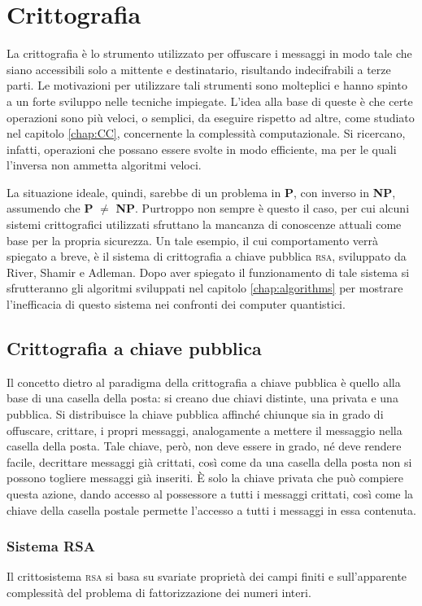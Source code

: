 \chapter{Crittografia}\label{app:Crypto}
La crittografia è lo strumento utilizzato per offuscare i messaggi in modo tale che siano accessibili solo a mittente e destinatario, risultando indecifrabili a terze parti.
Le motivazioni per utilizzare tali strumenti sono molteplici e hanno spinto a un forte sviluppo nelle tecniche impiegate.
L'idea alla base di queste è che certe operazioni sono più veloci, o semplici, da eseguire rispetto ad altre, come studiato nel capitolo \ref{chap:CC}, concernente la complessità computazionale.
Si ricercano, infatti, operazioni che possano essere svolte in modo efficiente, ma per le quali l'inversa non ammetta algoritmi veloci.

La situazione ideale, quindi, sarebbe di un problema in \textbf{P}, con inverso in \textbf{NP}, assumendo che \textbf{P} $\neq$ \textbf{NP}.
Purtroppo non sempre è questo il caso, per cui alcuni sistemi crittografici utilizzati sfruttano la mancanza di conoscenze attuali come base per la propria sicurezza.
Un tale esempio, il cui comportamento verrà spiegato a breve, è il sistema di crittografia a chiave pubblica \textsc{rsa}, sviluppato da River, Shamir e Adleman.
Dopo aver spiegato il funzionamento di tale sistema si sfrutteranno gli algoritmi sviluppati nel capitolo \ref{chap:algorithms} per mostrare l'inefficacia di questo sistema nei confronti dei computer quantistici.

\section{Crittografia a chiave pubblica}
Il concetto dietro al paradigma della crittografia a chiave pubblica è quello alla base di una casella della posta:
si creano due chiavi distinte, una privata e una pubblica.
Si distribuisce la chiave pubblica affinché chiunque sia in grado di offuscare, crittare, i propri messaggi, analogamente a mettere il messaggio nella casella della posta.
Tale chiave, però, non deve essere in grado, né deve rendere facile, decrittare messaggi già crittati, così come da una casella della posta non si possono togliere messaggi già inseriti.
È solo la chiave privata che può compiere questa azione, dando accesso al possessore a tutti i messaggi crittati, così come la chiave della casella postale permette l'accesso a tutti i messaggi in essa contenuta.

\subsection{Sistema RSA}
Il crittosistema \textsc{rsa} si basa su svariate proprietà dei campi finiti e sull'apparente complessità del problema di fattorizzazione dei numeri interi.

